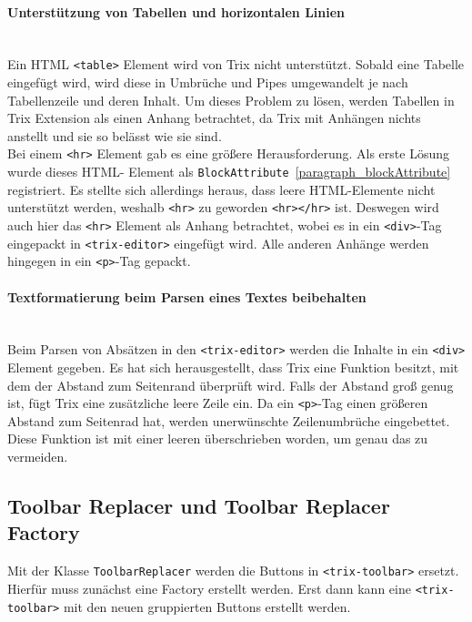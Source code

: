 \paragraph{Unterstützung von Tabellen und horizontalen Linien}
\mbox{}\\
Ein HTML \texttt{<table>} Element wird von Trix nicht unterstützt. Sobald eine Tabelle eingefügt wird, wird diese in 
Umbrüche und Pipes umgewandelt je nach Tabellenzeile und deren Inhalt. Um dieses Problem zu lösen, werden 
Tabellen in Trix Extension als einen Anhang betrachtet, da Trix mit Anhängen nichts anstellt und sie so belässt wie 
sie sind.\\
Bei einem \texttt{<hr>} Element gab es eine größere Herausforderung. Als erste Lösung wurde dieses HTML-
Element als \texttt{BlockAttribute}~\ref{paragraph_blockAttribute} registriert. Es stellte sich allerdings heraus, dass 
leere HTML-Elemente nicht unterstützt werden, weshalb \texttt{<hr>} zu geworden \texttt{<hr></hr>} ist. Deswegen 
wird auch hier das \texttt{<hr>} Element als Anhang betrachtet, wobei es in ein \texttt{<div>}-Tag eingepackt in 
\texttt{<trix-editor>} eingefügt wird. Alle anderen Anhänge werden hingegen in ein \texttt{<p>}-Tag gepackt.

\paragraph{Textformatierung beim Parsen eines Textes beibehalten}
\mbox{}\\
Beim Parsen von Absätzen in den \texttt{<trix-editor>} werden die Inhalte in ein \texttt{<div>} Element gegeben. Es hat sich herausgestellt, dass Trix eine Funktion besitzt, mit dem der Abstand zum Seitenrand überprüft wird. Falls der Abstand groß genug ist, fügt Trix eine zusätzliche leere Zeile ein. Da ein \texttt{<p>}-Tag einen größeren Abstand zum Seitenrad hat, werden unerwünschte Zeilenumbrüche eingebettet. Diese Funktion ist mit einer leeren überschrieben worden, um genau das zu vermeiden.

\subsection{Toolbar Replacer und Toolbar Replacer Factory}
\label{subsec_toolbar_replacer_factory}

Mit der Klasse \texttt{ToolbarReplacer} werden die Buttons in \texttt{<trix-toolbar>} ersetzt. Hierfür muss zunächst eine Factory erstellt werden. Erst dann kann eine \texttt{<trix-toolbar>} mit den neuen gruppierten Buttons erstellt werden.

